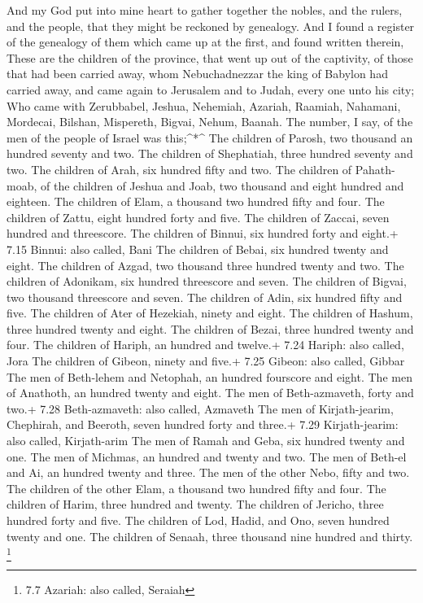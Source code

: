  And my God put into mine heart to gather together the
nobles, and the rulers, and the people, that they might be reckoned by
genealogy. And I found a register of the genealogy of them which came up
at the first, and found written therein,  These are the
children of the province, that went up out of the captivity, of those
that had been carried away, whom Nebuchadnezzar the king of Babylon had
carried away, and came again to Jerusalem and to Judah, every one unto
his city;  Who came with Zerubbabel, Jeshua, Nehemiah,
Azariah, Raamiah, Nahamani, Mordecai, Bilshan, Mispereth, Bigvai, Nehum,
Baanah. The number, I say, of the men of the people of Israel was
this;\^{}*\^{}  The children of Parosh, two thousand an
hundred seventy and two.  The children of Shephatiah, three
hundred seventy and two.  The children of Arah, six hundred
fifty and two.  The children of Pahath-moab, of the
children of Jeshua and Joab, two thousand and eight hundred and
eighteen.  The children of Elam, a thousand two hundred
fifty and four.  The children of Zattu, eight hundred forty
and five.  The children of Zaccai, seven hundred and
threescore.  The children of Binnui, six hundred forty and
eight.+ 7.15 Binnui: also called, Bani  The children of
Bebai, six hundred twenty and eight.  The children of
Azgad, two thousand three hundred twenty and two.  The
children of Adonikam, six hundred threescore and seven. 
The children of Bigvai, two thousand threescore and seven. 
The children of Adin, six hundred fifty and five.  The
children of Ater of Hezekiah, ninety and eight.  The
children of Hashum, three hundred twenty and eight.  The
children of Bezai, three hundred twenty and four.  The
children of Hariph, an hundred and twelve.+ 7.24 Hariph: also called,
Jora  The children of Gibeon, ninety and five.+ 7.25
Gibeon: also called, Gibbar  The men of Beth-lehem and
Netophah, an hundred fourscore and eight.  The men of
Anathoth, an hundred twenty and eight.  The men of
Beth-azmaveth, forty and two.+ 7.28 Beth-azmaveth: also called, Azmaveth
 The men of Kirjath-jearim, Chephirah, and Beeroth, seven
hundred forty and three.+ 7.29 Kirjath-jearim: also called, Kirjath-arim
 The men of Ramah and Geba, six hundred twenty and one.
 The men of Michmas, an hundred and twenty and two.
 The men of Beth-el and Ai, an hundred twenty and three.
 The men of the other Nebo, fifty and two. 
The children of the other Elam, a thousand two hundred fifty and four.
 The children of Harim, three hundred and twenty.
 The children of Jericho, three hundred forty and five.
 The children of Lod, Hadid, and Ono, seven hundred twenty
and one.  The children of Senaah, three thousand nine
hundred and thirty. \footnote{7.7 Azariah: also called, Seraiah}

